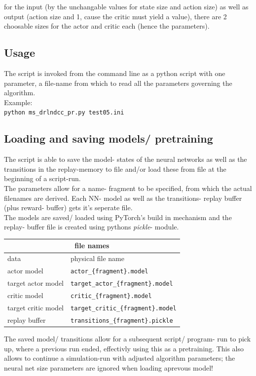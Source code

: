 \documentclass[a4paper]{article}
\begin{document}
 for the input
(by the unchangable values for state size and action size) as well as output
(action size and 1, cause the critic must yield a value), there are 2
choosable sizes for the actor and critic each (hence the parameters).

\subsection{Usage}
The script is invoked from the command line as a python script with one parameter,
a file-name from which to read all the parameters governing the algorithm.
\\
Example:\\
\texttt{python ms\_drlndcc\_pr.py test05.ini}

\subsection{Loading and saving models/ pretraining}
The script is able to save the model- states of the neural networks as well as
the transitions in the replay-memory to file and/or load these from file
at the beginning of a script-run.
\\
The parameters allow for a name- fragment to be specified, from which the
actual filenames are derived. Each NN- model as well as the transitions-
replay buffer (plus reward- buffer) gets it's seperate file.
\\
The models are saved/ loaded using PyTorch's build in mechanism and the
replay- buffer file is created using pythons \textit{pickle}- module.

\small
\begin{tabular}{ |l|l| }
  \hline
  \multicolumn{2}{|c|}{file names} \\
  \hline
data & physical file name \\
  \hline
actor model & \texttt{actor\_\{fragment\}.model} \\
target actor model & \texttt{target\_actor\_\{fragment\}.model} \\
critic model & \texttt{critic\_\{fragment\}.model} \\
target critic model & \texttt{target\_critic\_\{fragment\}.model} \\
replay buffer & \texttt{transitions\_\{fragment\}.pickle} \\
  \hline
\end{tabular}
\normalsize

The saved model/ transitions allow for a subsequent script/ program- run to
pick up, where a previous run ended, effectivly using this as a pretraining.
This also allows to continue a simulation-run with adjusted algorithm parameters;
the neural net size parameters are ignored when loading aprevous model!
\end{document}
